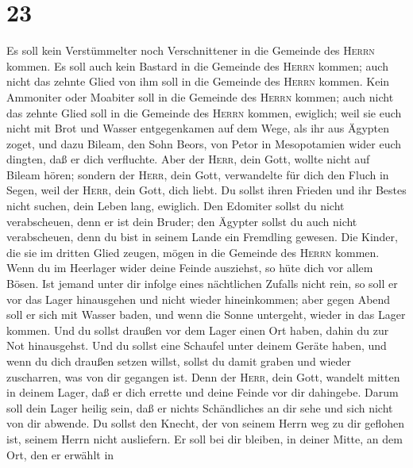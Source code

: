 \hypertarget{section-22}{%
\section{23}\label{section-22}}

 Es soll kein Verstümmelter noch Verschnittener in die
Gemeinde des \textsc{Herrn} kommen.  Es soll auch kein
Bastard in die Gemeinde des \textsc{Herrn} kommen; auch nicht das zehnte
Glied von ihm soll in die Gemeinde des \textsc{Herrn} kommen.
 Kein Ammoniter oder Moabiter soll in die Gemeinde des
\textsc{Herrn} kommen; auch nicht das zehnte Glied soll in die Gemeinde
des \textsc{Herrn} kommen, ewiglich;  weil sie euch nicht
mit Brot und Wasser entgegenkamen auf dem Wege, als ihr aus Ägypten
zoget, und dazu Bileam, den Sohn Beors, von Petor in Mesopotamien wider
euch dingten, daß er dich verfluchte.  Aber der
\textsc{Herr}, dein Gott, wollte nicht auf Bileam hören; sondern der
\textsc{Herr}, dein Gott, verwandelte für dich den Fluch in Segen, weil
der \textsc{Herr}, dein Gott, dich liebt.  Du sollst ihren
Frieden und ihr Bestes nicht suchen, dein Leben lang, ewiglich.
 Den Edomiter sollst du nicht verabscheuen, denn er ist
dein Bruder; den Ägypter sollst du auch nicht verabscheuen, denn du bist
in seinem Lande ein Fremdling gewesen.  Die Kinder, die
sie im dritten Glied zeugen, mögen in die Gemeinde des \textsc{Herrn}
kommen.  Wenn du im Heerlager wider deine Feinde
ausziehst, so hüte dich vor allem Bösen.  Ist jemand
unter dir infolge eines nächtlichen Zufalls nicht rein, so soll er vor
das Lager hinausgehen und nicht wieder hineinkommen; 
aber gegen Abend soll er sich mit Wasser baden, und wenn die Sonne
untergeht, wieder in das Lager kommen.  Und du sollst
draußen vor dem Lager einen Ort haben, dahin du zur Not hinausgehst.
 Und du sollst eine Schaufel unter deinem Geräte haben,
und wenn du dich draußen setzen willst, sollst du damit graben und
wieder zuscharren, was von dir gegangen ist.  Denn der
\textsc{Herr}, dein Gott, wandelt mitten in deinem Lager, daß er dich
errette und deine Feinde vor dir dahingebe. Darum soll dein Lager heilig
sein, daß er nichts Schändliches an dir sehe und sich nicht von dir
abwende.  Du sollst den Knecht, der von seinem Herrn weg
zu dir geflohen ist, seinem Herrn nicht ausliefern.  Er
soll bei dir bleiben, in deiner Mitte, an dem Ort, den er erwählt in
